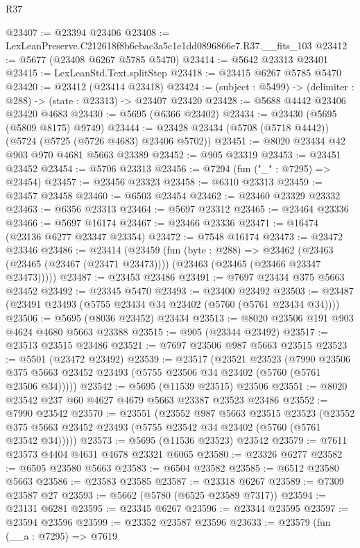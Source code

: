 \begin{lexlean}{R37}
\begin{coremodule}
@23407 := @23394 @23406
@23408 := LexLeanPreserve.C212618f8b6ebac3a5c1e1dd0896866e7.R37.__fits_103
@23412 := @5677 (@23408 @6267 @5785 @5470)
@23414 := @5642 @23313 @23401
@23415 := LexLeanStd.Text.splitStep
@23418 := @23415 @6267 @5785 @5470
@23420 := @23412 (@23414 @23418)
@23424 := (subject : @5499) -> (delimiter : @288) -> (state : @23313) -> @23407 @23420
@23428 := @5688 @4442 @23406 @23420 @4683
@23430 := @5695 (@6366 @23402)
@23434 := @23430 (@5695 (@5809 @8175) @9749)
@23444 := @23428 @23434 (@5708 (@5718 @4442)) (@5724 (@5725 (@5726 @4683) @23406 @5702))
@23451 := @8020 @23434 @42 @903 @970 @4681 @5663 @23389
@23452 := @905 @23319
@23453 := @23451 @23452
@23454 := @5706 @23313
@23456 := @7294 (fun ("_" : @7295) => @23454)
@23457 := @23456 @23323
@23458 := @6310 @23313
@23459 := @23457 @23458
@23460 := @6503 @23454
@23462 := @23460 @23329 @23332
@23463 := @6356 @23313
@23464 := @5697 @23312
@23465 := @23464 @23336
@23466 := @5697 @16174
@23467 := @23466 @23336
@23471 := @16474 (@23136 @6277 @23347 @23354)
@23472 := @7548 @16174
@23473 := @23472 @23346
@23486 := @23414
    (@23459
      (fun (byte : @288) =>
      @23462 (@23463 (@23465 (@23467 (@23471 @23473)))) (@23463 (@23465 (@23466 @23347 @23473)))))
@23487 := @23453 @23486
@23491 := @7697 @23434 @375 @5663 @23452
@23492 := @23345 @5470
@23493 := @23400 @23492
@23503 := @23487 (@23491 @23493 (@5755 @23434 @34 @23402 (@5760 (@5761 @23434 @34))))
@23506 := @5695 (@8036 @23452) @23434
@23513 := @8020 @23506 @191 @903 @4624 @4680 @5663 @23388
@23515 := @905 (@23344 @23492)
@23517 := @23513 @23515 @23486
@23521 := @7697 @23506 @987 @5663 @23515
@23523 := @5501 (@23472 @23492)
@23539 := @23517
    (@23521
      @23523
      (@7990 @23506 @375 @5663 @23452 @23493 (@5755 @23506 @34 @23402 (@5760 (@5761 @23506 @34)))))
@23542 := @5695 (@11539 @23515) @23506
@23551 := @8020 @23542 @237 @60 @4627 @4679 @5663 @23387 @23523 @23486
@23552 := @7990 @23542
@23570 := @23551
    (@23552
      @987
      @5663
      @23515
      @23523
      (@23552 @375 @5663 @23452 @23493 (@5755 @23542 @34 @23402 (@5760 (@5761 @23542 @34)))))
@23573 := @5695 (@11536 @23523) @23542
@23579 := @7611 @23573 @4404 @4631 @4678 @23321 @6065
@23580 := @23326 @6277
@23582 := @6505 @23580 @5663
@23583 := @6504 @23582
@23585 := @6512 @23580 @5663
@23586 := @23583 @23585
@23587 := @23318 @6267
@23589 := @7309 @23587 @27
@23593 := @5662 (@5780 (@6525 @23589 @7317))
@23594 := @23131 @6281
@23595 := @23345 @6267
@23596 := @23344 @23595
@23597 := @23594 @23596
@23599 := @23352 @23587 @23596
@23633 := @23579
    (fun (__a : @7295) =>
    @7619

\end{coremodule}
\end{lexlean}
